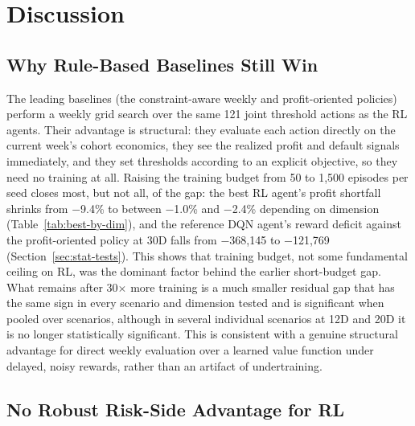 \documentclass[preprint,review,authoryear,12pt]{elsarticle}
\begin{document}
\section{Discussion}

\subsection{Why Rule-Based Baselines Still Win}

The leading baselines (the constraint-aware weekly and profit-oriented policies) perform
a weekly grid search over the same 121 joint threshold actions as the RL agents. Their
advantage is structural: they evaluate each action directly on the current week's cohort
economics, they see the realized profit and default signals immediately, and they set
thresholds according to an explicit objective, so they need no training at all. Raising
the training budget from 50 to 1{,}500 episodes per seed closes most, but not all, of the
gap: the best RL agent's profit shortfall shrinks from $-$9.4\% to between $-$1.0\% and
$-$2.4\% depending on dimension (Table~\ref{tab:best-by-dim}), and the reference DQN
agent's reward deficit against the profit-oriented policy at 30D falls from
$-$368{,}145 to $-$121{,}769 (Section~\ref{sec:stat-tests}). This shows that training
budget, not some fundamental ceiling on RL, was the dominant factor behind the earlier
short-budget gap. What remains after 30$\times$ more training is a much smaller residual
gap that has the same sign in every scenario and dimension tested and is significant when
pooled over scenarios, although in several individual scenarios at 12D and 20D it is no
longer statistically significant. This is consistent with a genuine structural advantage for direct weekly evaluation over a learned value
function under delayed, noisy rewards, rather than an artifact of undertraining.

\subsection{No Robust Risk-Side Advantage for RL}
\end{document}
